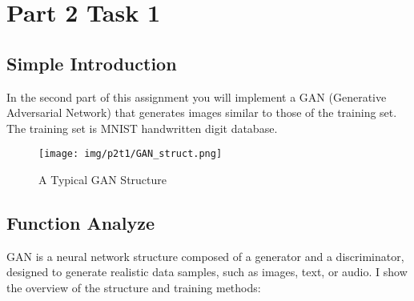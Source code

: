 \section{Part 2 Task 1}

\subsection{Simple Introduction}

In the second part of this assignment you will implement a GAN (Generative Adversarial Network) \cite{goodfellow2014generative} that generates images similar to those of the training set.
The training set is MNIST handwritten digit database.

\begin{figure}[!htbp]
  \centering
  \texttt{[image: img/p2t1/GAN\_struct.png]}
  \caption{A Typical GAN Structure}
  \label{fig:p2_gan_struct}
\end{figure}

\subsection{Function Analyze}

GAN is a neural network structure composed of a generator and a discriminator, designed to generate realistic data samples, such as images, text, or audio.
I show the overview of the structure and training methods:

